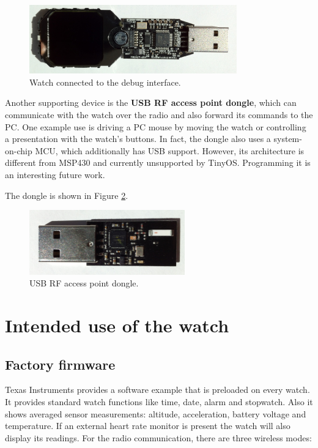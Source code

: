 \begin{figure}[h]
  \centering
  \includegraphics[width=0.8\textwidth]{img/chronos_dongle.jpg}
  \caption{Watch connected to the debug interface.}
  \label{fig:chronos_dongle}
\end{figure}

Another supporting device is the {\bf USB RF access point dongle},
which can communicate with the watch over the radio and also forward
its commands to the PC. One example use is driving a PC mouse by
moving the watch or controlling a presentation with the watch's
buttons. In fact, the dongle also uses a system-on-chip MCU, which
additionally has USB support. However, its architecture is different
from MSP430 and currently unsupported by TinyOS. Programming it is an
interesting future work.

The dongle is shown in Figure \ref{fig:chronos_rfdongle}.

\begin{figure}[h]
  \centering
  \includegraphics[width=0.6\textwidth]{img/chronos_rfdongle.jpg}
  \caption{USB RF access point dongle.}
  \label{fig:chronos_rfdongle}
\end{figure}

\section{Intended use of the watch}
\label{ch:intended_use_of_watch}

\subsection{Factory firmware}

Texas Instruments provides a software example that is preloaded on every
watch. It provides standard watch functions like time, date, alarm and
stopwatch. Also it shows averaged sensor measurements: altitude,
acceleration, battery voltage and temperature. If an external  heart
rate monitor is present the watch will also display its readings. For
the radio communication, there are three wireless modes:

